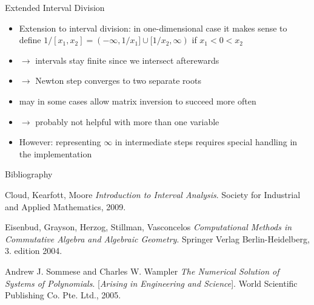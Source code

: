 \documentclass[german,10pt,xcolor=colortbl,compress]{beamer}
\begin{document}
\begin{frame}{Extended Interval Division}
    \begin{itemize}
        \item Extension to interval division: in one-dimensional case it makes sense to
            define $1/[x_1, x_2] = (-\infty, 1/x_1] \cup [1/x_2, \infty)$ if $x_1 < 0 <
            x_2$
        \item[]$\rightarrow$ intervals stay finite since we intersect afterewards
        \item[]$\rightarrow$ Newton step converges to two separate roots
        \item may in some cases allow matrix inversion to succeed more often
        \item[]$\rightarrow$ probably not helpful with more than one variable
        \item However: representing $\infty$ in intermediate steps requires special
            handling in the implementation
    \end{itemize}
\end{frame}


\begin{frame}{Bibliography}
    
    \begin{thebibliography}{9}
         Cloud, Kearfott, Moore
            \textit{Introduction to Interval Analysis}.
            Society for Industrial and Applied Mathematics, 2009.


         Eisenbud, Grayson, Herzog, Stillman, Vasconcelos
            \textit{Computational Methods in Commutative Algebra and Algebraic Geometry}.
            Springer Verlag Berlin-Heidelberg, 3. edition 2004.

         Andrew J. Sommese and Charles W. Wampler
            \textit{The Numerical Solution of Systems of Polynomials}. [\textit{Arising in
            Engineering and Science}].
            World Scientific Publishing Co. Pte. Ltd., 2005.

    \end{thebibliography}
\end{frame}
\end{document}
